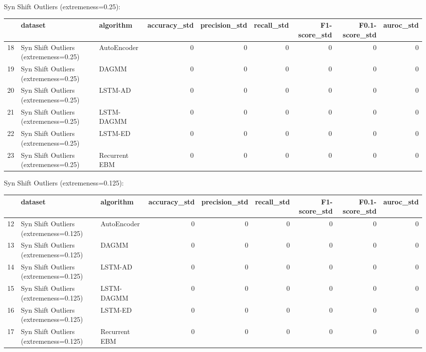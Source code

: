 Syn Shift Outliers (extremeness=0.25):

\begin{tabular}{rllrrrrrr}
\hline
    & dataset                               & algorithm     &   accuracy\_std &   precision\_std &   recall\_std &   F1-score\_std &   F0.1-score\_std &   auroc\_std \\
\hline
 18 & Syn Shift Outliers (extremeness=0.25) & AutoEncoder   &              0 &               0 &            0 &              0 &                0 &           0 \\
 19 & Syn Shift Outliers (extremeness=0.25) & DAGMM         &              0 &               0 &            0 &              0 &                0 &           0 \\
 20 & Syn Shift Outliers (extremeness=0.25) & LSTM-AD       &              0 &               0 &            0 &              0 &                0 &           0 \\
 21 & Syn Shift Outliers (extremeness=0.25) & LSTM-DAGMM    &              0 &               0 &            0 &              0 &                0 &           0 \\
 22 & Syn Shift Outliers (extremeness=0.25) & LSTM-ED       &              0 &               0 &            0 &              0 &                0 &           0 \\
 23 & Syn Shift Outliers (extremeness=0.25) & Recurrent EBM &              0 &               0 &            0 &              0 &                0 &           0 \\
\hline
\end{tabular}

Syn Shift Outliers (extremeness=0.125):

\begin{tabular}{rllrrrrrr}
\hline
    & dataset                                & algorithm     &   accuracy\_std &   precision\_std &   recall\_std &   F1-score\_std &   F0.1-score\_std &   auroc\_std \\
\hline
 12 & Syn Shift Outliers (extremeness=0.125) & AutoEncoder   &              0 &               0 &            0 &              0 &                0 &           0 \\
 13 & Syn Shift Outliers (extremeness=0.125) & DAGMM         &              0 &               0 &            0 &              0 &                0 &           0 \\
 14 & Syn Shift Outliers (extremeness=0.125) & LSTM-AD       &              0 &               0 &            0 &              0 &                0 &           0 \\
 15 & Syn Shift Outliers (extremeness=0.125) & LSTM-DAGMM    &              0 &               0 &            0 &              0 &                0 &           0 \\
 16 & Syn Shift Outliers (extremeness=0.125) & LSTM-ED       &              0 &               0 &            0 &              0 &                0 &           0 \\
 17 & Syn Shift Outliers (extremeness=0.125) & Recurrent EBM &              0 &               0 &            0 &              0 &                0 &           0 \\
\hline
\end{tabular}

